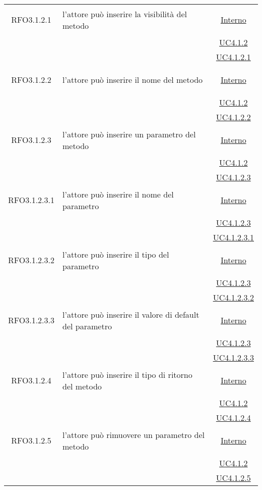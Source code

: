 \begin{longtable}{|c|>{\centering}m{7cm}|c|}
\hypertarget{RFO3.1.2.1}{RFO3.1.2.1} & l'attore può inserire la visibilità del metodo & \hyperlink{Interno}{Interno}\\
& &\hyperref[UC4.1.2]{UC4.1.2}\\
& &\hyperref[UC4.1.2.1]{UC4.1.2.1}\\ \hline

\hypertarget{RFO3.1.2.2}{RFO3.1.2.2} & l'attore può inserire il nome del metodo & \hyperlink{Interno}{Interno}\\
& &\hyperref[UC4.1.2]{UC4.1.2}\\
& &\hyperref[UC4.1.2.2]{UC4.1.2.2}\\ \hline

\hypertarget{RFO3.1.2.3}{RFO3.1.2.3} & l'attore può inserire un parametro del metodo & \hyperlink{Interno}{Interno}\\
& &\hyperref[UC4.1.2]{UC4.1.2}\\
& &\hyperref[UC4.1.2.3]{UC4.1.2.3}\\ \hline

\hypertarget{RFO3.1.2.3.1}{RFO3.1.2.3.1} & l'attore può inserire il nome del parametro & \hyperlink{Interno}{Interno}\\
& &\hyperref[UC4.1.2.3]{UC4.1.2.3}\\
& &\hyperref[UC4.1.2.3.1]{UC4.1.2.3.1}\\ \hline

\hypertarget{RFO3.1.2.3.2}{RFO3.1.2.3.2} & l'attore può inserire il tipo del parametro & \hyperlink{Interno}{Interno}\\
& &\hyperref[UC4.1.2.3]{UC4.1.2.3}\\
& &\hyperref[UC4.1.2.3.2]{UC4.1.2.3.2}\\ \hline

\hypertarget{RFO3.1.2.3.3}{RFO3.1.2.3.3} & l'attore può inserire il valore di default del parametro & \hyperlink{Interno}{Interno}\\
& &\hyperref[UC4.1.2.3]{UC4.1.2.3}\\
& &\hyperref[UC4.1.2.3.3]{UC4.1.2.3.3}\\ \hline

\hypertarget{RFO3.1.2.4}{RFO3.1.2.4} & l'attore può inserire il tipo di ritorno del metodo & \hyperlink{Interno}{Interno}\\
& &\hyperref[UC4.1.2]{UC4.1.2}\\
& &\hyperref[UC4.1.2.4]{UC4.1.2.4}\\ \hline

\hypertarget{RFO3.1.2.5}{RFO3.1.2.5} & l'attore può rimuovere un parametro del metodo & \hyperlink{Interno}{Interno}\\
& &\hyperref[UC4.1.2]{UC4.1.2}\\
& &\hyperref[UC4.1.2.5]{UC4.1.2.5}\\ \hline


\end{longtable}
